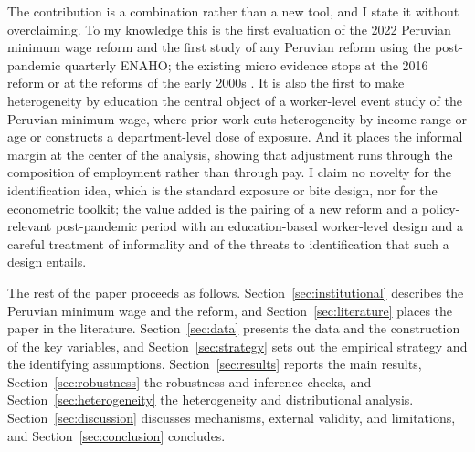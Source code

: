 The contribution is a combination rather than a new tool, and I state it without overclaiming.
To my knowledge this is the first evaluation of the 2022 Peruvian minimum wage reform and
the first study of any Peruvian reform using the post-pandemic quarterly ENAHO; the existing
micro evidence stops at the 2016 reform \citep{jimenez_2023} or at the reforms of the early
2000s \citep{jaramillo_lopez_2006, cespedes_2005}. It is also the first to make heterogeneity
by education the central object of a worker-level event study of the Peruvian minimum wage,
where prior work cuts heterogeneity by income range or age or constructs a department-level
dose of exposure. And it places the informal margin at the center of the analysis, showing
that adjustment runs through the composition of employment rather than through pay. I claim no
novelty for the identification idea, which is the standard exposure or bite design, nor for
the econometric toolkit; the value added is the pairing of a new reform and a policy-relevant
post-pandemic period with an education-based worker-level design and a careful treatment of
informality and of the threats to identification that such a design entails.

The rest of the paper proceeds as follows. Section~\ref{sec:institutional} describes the
Peruvian minimum wage and the reform, and Section~\ref{sec:literature} places the paper in the
literature. Section~\ref{sec:data} presents the data and the construction of the key
variables, and Section~\ref{sec:strategy} sets out the empirical strategy and the identifying
assumptions. Section~\ref{sec:results} reports the main results, Section~\ref{sec:robustness}
the robustness and inference checks, and Section~\ref{sec:heterogeneity} the heterogeneity and
distributional analysis. Section~\ref{sec:discussion} discusses mechanisms, external validity,
and limitations, and Section~\ref{sec:conclusion} concludes.
